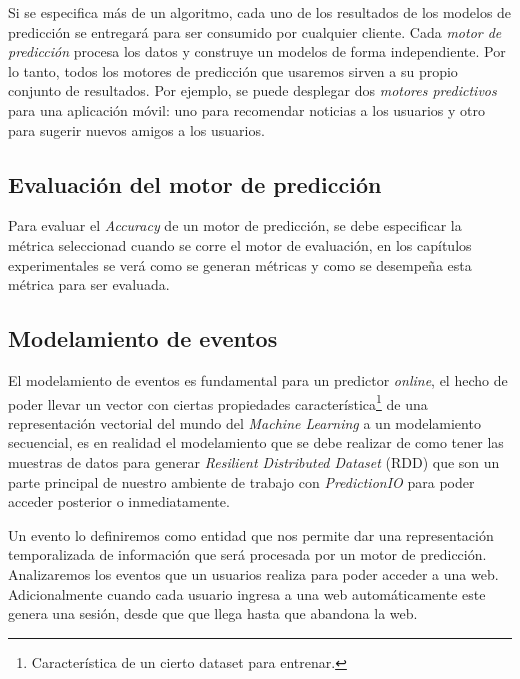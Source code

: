   Si se especifica más de un algoritmo, cada uno de los resultados de los modelos de predicción se entregará para ser consumido por cualquier cliente.
  Cada \emph{motor de predicción} procesa los datos y construye un modelos de forma independiente. Por lo tanto, todos los motores de predicción que usaremos sirven a su propio conjunto de resultados. Por ejemplo, se puede desplegar dos \emph{motores predictivos} para una aplicación móvil: uno para recomendar noticias a los usuarios y otro para sugerir nuevos amigos a los usuarios.


\vspace{1cm}
\subsection{Evaluación del motor de predicción }

  Para evaluar el \emph{Accuracy} de un motor de predicción, se debe especificar la métrica seleccionad cuando se corre el motor de evaluación, en los capítulos experimentales se verá como se generan métricas y como se desempeña esta métrica para ser evaluada.











\subsection{Modelamiento de eventos}





  El modelamiento de eventos es fundamental para un predictor \emph{online}, el hecho de poder llevar un vector con ciertas propiedades característica\footnote{Característica de un cierto dataset para entrenar.} de una representación vectorial del mundo del \emph{Machine Learning} a un modelamiento secuencial, es en realidad el modelamiento que se debe realizar de como  tener las muestras de datos para generar \emph{Resilient Distributed Dataset} (RDD) que son un parte principal de nuestro ambiente de trabajo con \emph{PredictionIO} para poder acceder posterior o inmediatamente. 

  Un evento lo definiremos como entidad que nos permite dar una representación temporalizada de información que será procesada por un motor de predicción. Analizaremos los eventos que un usuarios realiza para poder acceder a una web. Adicionalmente cuando cada usuario ingresa a una web automáticamente este genera una sesión, desde que que llega hasta que abandona la web.

